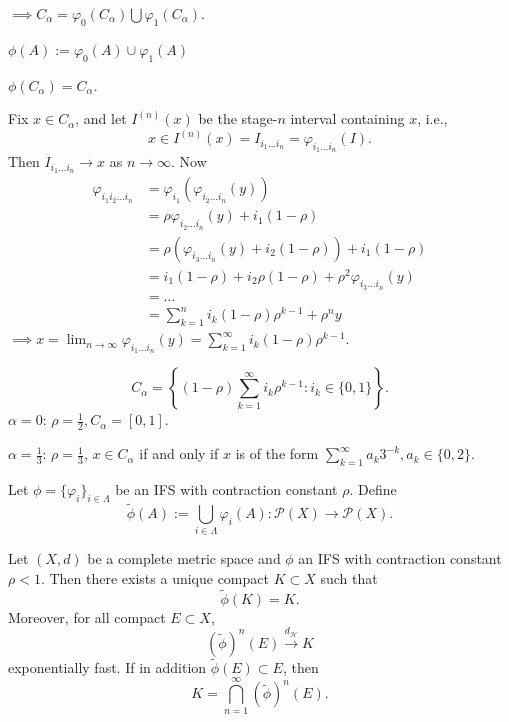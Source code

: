 $\implies C_{\alpha}=\varphi_{0}(C_{\alpha})\bigcup \varphi_{1}(C_{\alpha})$.

$\phi(A):=\varphi_{0}(A)\cup \varphi_{1}(A)$

$\phi(C_{\alpha})=C_{\alpha}$.

Fix $x \in C_{\alpha}$, and let $I^{(n)}(x)$ be the stage-$n$ interval containing $x$, i.e.,
\[
x \in I^{(n)}(x)=I_{i_{1}\dots i_{n}}=\varphi _{i_{1}\dots i_{n}}(I).
\]
Then $I_{i_{1}\dots i_{n}}\to x$ as $n\to \infty$.
Now
\begin{align*}
\varphi _{i_{1}i_{2}\dots i_{n}} & =\varphi _{i_{1}}(\varphi _{i_{2}\dots i_{n}}(y)) \\
 & =\rho \varphi _{i_{2}\dots i_{n}}(y)+i_{1}(1-\rho) \\
 & =\rho(\varphi _{i_{3}\dots i_{n}}(y)+i_{2}(1-\rho))+i_{1}(1-\rho) \\
 & =i_{1}(1-\rho)+i_{2}\rho(1-\rho)+\rho^{2}\varphi _{i_{3}\dots i_{n}}(y) \\
 & =\dots \\
 & = \sum _{k=1}^{n}i_{k}(1-\rho)\rho ^{k-1} +\rho ^{n}y
\end{align*}
$\displaystyle \implies x=\lim_{ n \to \infty }\varphi _{i_{1}\dots i_{n}}(y)= \sum _{k=1}^{\infty}i_{k}(1-\rho)\rho ^{k-1}$.

\[
C_{\alpha}=\left\{  (1-\rho)\sum _{k=1}^{\infty}i_{k}\rho ^{k-1}:i_{k}\in \{ 0,1 \}  \right\}.
\]
$\alpha=0$: $\rho=\frac{1}{2},C_{\alpha}=[0,1]$.

$\alpha=\frac{1}{3}$: $\rho=\frac{1}{3}$, $x \in C_{\alpha}$ if and only if $x$ is of the form $\displaystyle \sum _{k=1}^{\infty}a_{k}3^{-k}, a_{k}\in \{ 0,2 \}$.

Let $\phi=\{ \varphi _{i} \}_{i \in \Lambda}$ be an IFS with contraction constant $\rho$. Define
\[
\tilde{\phi}(A):= \bigcup _{i \in \Lambda}\varphi _{i}(A): \mathcal{P}(X)\to \mathcal{P}(X).
\]

\begin{theorem}\label{thm:2.2}
Let $(X,d)$ be a complete metric space and $\phi$ an IFS with contraction constant $\rho<1$. Then there exists a unique compact $K\subset X$ such that
\begin{equation}\label{eq:1}
\tilde{\phi}(K)=K.
\end{equation}
Moreover, for all compact $E \subset X$, 
\[
(\tilde{\phi})^{n}(E)\xrightarrow{d_{\mathcal{H}}}K
\]
exponentially fast. If in addition $\tilde{\phi}(E)\subset E$, then
\[
K=\bigcap _{n=1}^{\infty}(\tilde{\phi})^{n}(E).
\]
\end{theorem}

